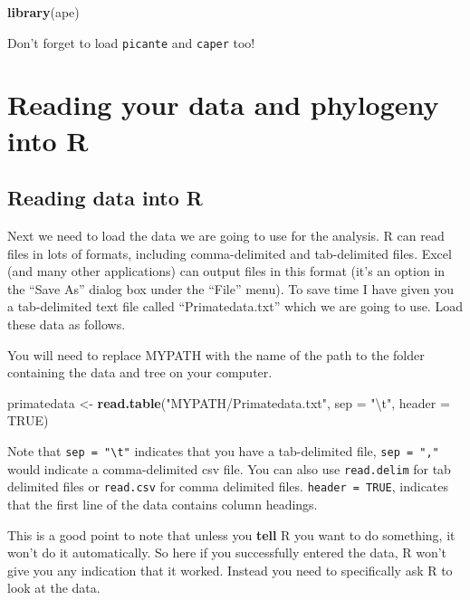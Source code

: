 \documentclass[12pt]{article}
\newcommand{\KeywordTok}[1]{\textcolor[rgb]{0.13,0.29,0.53}{\textbf{{#1}}}}
\newcommand{\DataTypeTok}[1]{\textcolor[rgb]{0.13,0.29,0.53}{{#1}}}
\newcommand{\CharTok}[1]{\textcolor[rgb]{0.31,0.60,0.02}{{#1}}}
\newcommand{\StringTok}[1]{\textcolor[rgb]{0.31,0.60,0.02}{{#1}}}
\newcommand{\OtherTok}[1]{\textcolor[rgb]{0.56,0.35,0.01}{{#1}}}
\newcommand{\NormalTok}[1]{{#1}}
\begin{document}
\begin{snugshade}
\begin{Highlighting}[]
\KeywordTok{library}\NormalTok{(ape)}
\end{Highlighting}
\end{snugshade}

Don't forget to load \texttt{picante} and \texttt{caper} too!

\newpage
\section{Reading your data and phylogeny into R}
\subsection{Reading data into R}

Next we need to load the data we are going to use for the analysis. R
can read files in lots of formats, including comma-delimited and
tab-delimited files. Excel (and many other applications) can output
files in this format (it's an option in the ``Save As'' dialog box
under the ``File'' menu). To save time I have given you a tab-delimited
text file called ``Primatedata.txt'' which we are going to use. Load
these data as follows. 

\begin{framed}
You will need to replace MYPATH with the name of the path to the folder containing the data and tree on your computer.
\end{framed}

\begin{snugshade}
\begin{Highlighting}[]
\NormalTok{primatedata <-}\StringTok{ }\KeywordTok{read.table}\NormalTok{(}\StringTok{"MYPATH/Primatedata.txt"}\NormalTok{, }\DataTypeTok{sep =} \StringTok{"}\CharTok{\textbackslash{}t}\StringTok{"}\NormalTok{, }
                          \DataTypeTok{header =} \OtherTok{TRUE}\NormalTok{)}
\end{Highlighting}
\end{snugshade}

Note that \texttt{sep = "\textbackslash{}t"} indicates that you have a tab-delimited file, 
\texttt{sep = ","}  would indicate a comma-delimited csv file. You can also use
\texttt{read.delim} for tab delimited files or \texttt{read.csv} for comma delimited
files. \texttt{header = TRUE}, indicates that the first line of the data contains
column headings.

This is a good point to note that unless you \textbf{tell} R you want to
do something, it won't do it automatically. So here if you successfully
entered the data, R won't give you any indication that it worked.
Instead you need to specifically ask R to look at the data.
\end{document}
